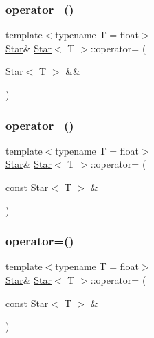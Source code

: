 \mbox{\label{classStar_a7113d2808314f0aa2f5a87325f8c535d}} 
\subsubsection{\texorpdfstring{operator=()}{operator=()}\hspace{0.1cm}{\footnotesize\ttfamily [2/4]}}
{\footnotesize\ttfamily template$<$typename T  = float$>$ \\
\mbox{\hyperlink{classStar}{Star}}\& \mbox{\hyperlink{classStar}{Star}}$<$ T $>$\+::operator= (\begin{DoxyParamCaption}\item[{\mbox{\hyperlink{classStar}{Star}}$<$ T $>$ \&\&}]{ }\end{DoxyParamCaption})\hspace{0.3cm}{\ttfamily [default]}}

\mbox{\label{classStar_a3507f157448e082ccfcadc4783f2610e}} 
\subsubsection{\texorpdfstring{operator=()}{operator=()}\hspace{0.1cm}{\footnotesize\ttfamily [3/4]}}
{\footnotesize\ttfamily template$<$typename T  = float$>$ \\
\mbox{\hyperlink{classStar}{Star}}\& \mbox{\hyperlink{classStar}{Star}}$<$ T $>$\+::operator= (\begin{DoxyParamCaption}\item[{const \mbox{\hyperlink{classStar}{Star}}$<$ T $>$ \&}]{ }\end{DoxyParamCaption})\hspace{0.3cm}{\ttfamily [default]}}

\mbox{\label{classStar_a3507f157448e082ccfcadc4783f2610e}} 
\subsubsection{\texorpdfstring{operator=()}{operator=()}\hspace{0.1cm}{\footnotesize\ttfamily [4/4]}}
{\footnotesize\ttfamily template$<$typename T  = float$>$ \\
\mbox{\hyperlink{classStar}{Star}}\& \mbox{\hyperlink{classStar}{Star}}$<$ T $>$\+::operator= (\begin{DoxyParamCaption}\item[{const \mbox{\hyperlink{classStar}{Star}}$<$ T $>$ \&}]{ }\end{DoxyParamCaption})\hspace{0.3cm}{\ttfamily [default]}}

